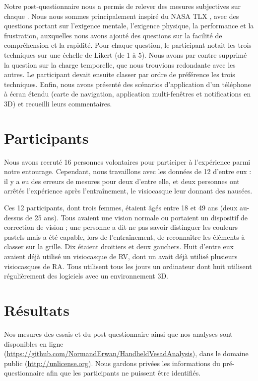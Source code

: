 Notre post-questionnaire nous a permis de relever des mesures subjectives sur chaque . Nous nous sommes principalement inspiré du NASA TLX \cite{Rubio2004}, avec des questions portant sur l'exigence mentale, l'exigence physique, la performance et la frustration, auxquelles nous avons ajouté des questions sur la facilité de compréhension et la rapidité. Pour chaque question, le participant notait les trois techniques sur une échelle de Likert (de 1 à 5). Nous avons par contre supprimé la question sur la charge temporelle, que nous trouvions redondante avec les autres. Le participant devait ensuite classer par ordre de préférence les trois techniques. Enfin, nous avons présenté des scénarios d'application d'un téléphone à écran étendu (carte de navigation, application multi-fenêtres et notifications en 3D) et recueilli leurs commentaires.


\section{Participants}
\label{sec:experiment_participants}

Nous avons recruté 16 personnes volontaires pour participer à l'expérience parmi notre entourage. Cependant, nous travaillons avec les données de 12 d'entre eux : il y a eu des erreurs de mesures pour deux d'entre elle, et deux personnes ont arrêtés l'expérience après l'entraînement, le visiocasque leur donnant des nausées.

Ces 12 participants, dont trois femmes, étaient âgés entre 18 et 49 ans (deux au-dessus de 25 ans). Tous avaient une vision normale ou portaient un dispositif de correction de vision ; une personne a dit ne pas savoir distinguer les couleurs pastels mais a été capable, lors de l'entraînement, de reconnaître les éléments à classer sur la grille. Dix étaient droitiers et deux gauchers. Huit d'entre eux avaient déjà utilisé un visiocasque de RV, dont un avait déjà utilisé plusieurs visiocasques de RA. Tous utilisent tous les jours un ordinateur dont huit utilisent régulièrement des logiciels avec un environnement 3D.


\section{Résultats}
\label{sec:experiment_results}

Nos mesures des essais et du post-questionnaire ainsi que nos analyses sont disponibles en ligne (\url{https://github.com/NormandErwan/HandheldVesadAnalysis}), dans le domaine public (\url{http://unlicense.org}). Nous gardons privées les informations du pré-questionnaire afin que les participants ne puissent être identifiés.

